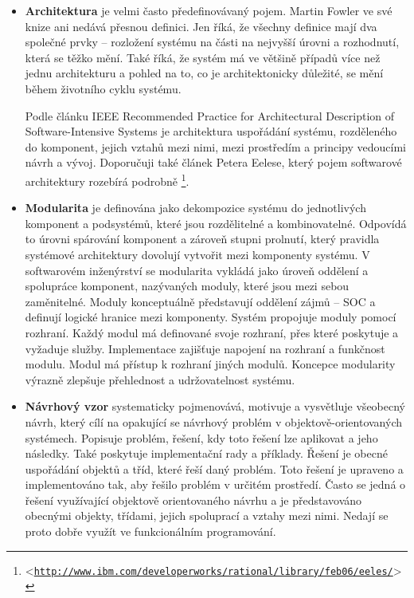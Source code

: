 \documentclass[11pt,twoside,a4paper]{book}
\let\oldUrl\url
\renewcommand\url[1]{<\texttt{\oldUrl{#1}}>}
\begin{document}
\begin{itemize}
\item \textbf{Architektura} je velmi často předefinovávaný pojem. Martin Fowler ve své knize \cite{PEAA} ani nedává přesnou definici. Jen říká, že všechny definice mají dva společné prvky -- rozložení systému na části na nejvyšší úrovni a rozhodnutí, která se těžko mění. Také říká, že systém má ve většině případů více než jednu architekturu a pohled na to, co je architektonicky důležité, se mění během životního cyklu systému.

Podle článku IEEE Recommended Practice for Architectural Description of Software-Intensive Systems \cite{IEEE1471} je architektura uspořádání systému, rozděleného do komponent, jejich vztahů mezi nimi, mezi prostředím a principy vedoucími návrh a vývoj. Doporučuji také článek Petera Eelese, který pojem softwarové architektury rozebírá podrobně \footnote{\url{http://www.ibm.com/developerworks/rational/library/feb06/eeles/}}.


\item \textbf{Modularita} je definována jako dekompozice systému do jednotlivých komponent a podsystémů, které jsou rozdělitelné a kombinovatelné\cite{POSA}. Odpovídá to úrovni spárování komponent a zároveň stupni prolnutí, který pravidla systémové architektury dovolují vytvořit mezi komponenty systému. V softwarovém inženýrství se modularita vykládá jako úroveň oddělení a spolupráce komponent, nazývaných moduly, které jsou mezi sebou zaměnitelné. Moduly konceptuálně představují oddělení zájmů -- SOC a definují logické hranice mezi komponenty. Systém propojuje moduly pomocí rozhraní. Každý modul má definované svoje rozhraní, přes které poskytuje a vyžaduje služby. Implementace zajišťuje napojení na rozhraní a funkčnost modulu. Modul má přístup k rozhraní jiných modulů. Koncepce modularity výrazně zlepšuje přehlednost a udržovatelnost systému\cite{POSA}\cite{wiki:modular-programming}. 

\item \textbf{Návrhový vzor} systematicky pojmenovává, motivuje a vysvětluje všeobecný návrh, který cílí na opakující se návrhový problém v objektově-orientovaných systémech. Popisuje problém, řešení, kdy toto řešení lze aplikovat a jeho následky. Také poskytuje implementační rady a příklady. Řešení je obecné uspořádání objektů a tříd, které řeší daný problém. Toto řešení je upraveno a implementováno tak, aby řešilo problém v určitém prostředí\cite{GOF}. Často se jedná o řešení využívající objektově orientovaného návrhu a je představováno obecnými objekty, třídami, jejich spoluprací a vztahy mezi nimi. Nedají se proto dobře využít ve funkcionálním programování. \cite{wiki:design-pattern-computer-science}


\end{itemize}
\end{document}
